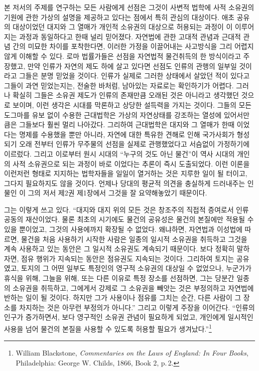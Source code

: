 본 저서의 주제를 연구하는 모든 사람에게
선점은
그것이
사변적 법학에
사적 소유권의 기원에 관한 가상의 설명을
제공하고 있다는 점에서
특히 관심의 대상이다.
애초 공유의 대상이었던 대지와 그 열매가
개인적 소유권의 대상으로 허용되는 과정이
이 이루어지는 과정과 동일하다고 한때 널리 믿어졌다.
자연법에 관한 고대적 관념과 근대적 관념 간의 미묘한 차이를 포착한다면,
이러한 가정을 이끌어내는 사고방식을
그리 어렵지 않게 이해할 수 있다.
로마 법률가들은 선점을 자연법적 물건취득의 한 방식이라고 주장했고,
만약 인류가 자연의 제도 하에 살고 있다면
선점도 인류의 관행의 일부일 것이라고 그들은 분명 믿었을 것이다.
인류가 실제로 그러한 상태에서 살았던 적이 있다고 그들이 과연 믿었는지는,
전술한 바처럼, 남아있는 자료로는 확인하기가 어렵다.
그러나 확실히 그들은
소유권 제도가 인류의 존재만큼 오래된 것은 아니라고 생각했던 것으로 보이며,
이런 생각은 시대를 막론하고 상당한 설득력을 가지는 것이다.
그들의 모든 도그마를 유보 없이 수용한 근대법학은
가상의 자연상태를 강조하는 열성에 있어서만큼은
그들보다 훨씬 멀리 나아갔다.
그리하여 근대법학은
대지와 그 열매가 한때 이었다는 명제를
수용했을 뿐만 아니라,
자연에 대한 특유한 견해로 인해
국가사회가 형성되기 오래 전부터
인류가 무주물의 선점을 실제로 관행했었다고
서슴없이
가정하기에 이르렀다.
그리고 이로부터
원시 시대의 ``누구의 것도 아닌 물건''이
역사 시대의 개인의 사적 소유권으로 되는 과정이
바로 이었다는 추론이
즉시
도출되었다.
이런 이론을
이런저런 형태로
지지하는 법학자들을 일일이 열거하는 것은
지루한 일이 될 터이고,
그다지 필요하지도 않을 것이다.
언제나
당대의 평균적 의견을 충실하게 드러내주는 인물인
이 그의 저서 제2권 제1장에서
그것을 잘 요약해놓았기 때문이다.

그는 이렇게 쓰고 있다.
``대지와 대지 위의 모든 것은 창조주의 직접적 증여로서
인류 공동의 재산이었다.
물론
최초의 시기에도
물건의 공유성은
물건의 본질에만 적용될 수 있을 뿐이었고,
그것의 사용에까지 확장될 수 없었다.
왜냐하면, 자연법과 이성법에 따르면,
물건을 처음 사용하기 시작한 사람은
일종의 일시적 소유권을 취득하고
그것을 계속 사용하고 있는 동안은 그 일시적 소유권도 계속되기 때문이다.
보다 정확히 말하자면,
점유 행위가 지속되는 동안은 점유권도 지속되는 것이다.
그리하여 토지는 공유였고,
토지의 그 어떤 일부도 특정인의 영구적 소유권의 대상일 수 없었으나,
누군가가
휴식을 위해, 그늘을 위해, 또는 다른 이유로
특정 장소를 선점하면,
그는 당분간 일종의 소유권을 취득하고,
그에게서 강제로 그 소유권을 빼앗는 것은 부정의하고
자연법에 반하는 일이 될 것이다. 하지만
그가 사용이나 점유를 그치는 순간,
다른 사람이 그 장소를 차지하는 것은 아무런 부정의가 아니다.''
그리고 이렇게 주장을 이어간다.
``인류의 인구가 증가하면서,
보다 영구적인 소유권 관념이 필요하게 되었고,
개인에게
일시적인 사용을 넘어
물건의 본질을 사용할 수 있도록
허용할 필요가 생겨났다.''\footnote{%
  \latinmarks
  William Blackstone,
  \textit{Commentaries on the Laws of England: In Four Books},
  Philadelphia: George W. Childs, 1866,
  Book 2, p.\,2. }

